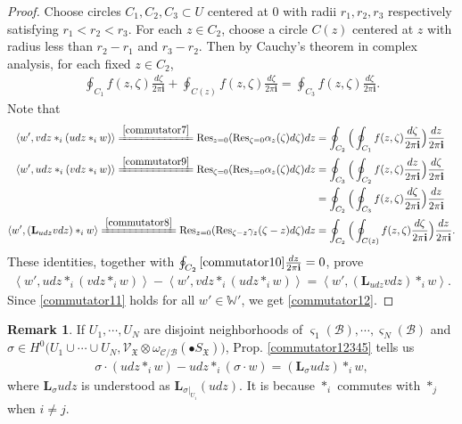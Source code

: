 \documentclass[11pt,b5paper,notitlepage]{article}
\theoremstyle{definition}
\newtheorem{rem}[df]{Remark}
\theoremstyle{plain}
\newcommand{\Lbf}{\mathbf{L}}
\newcommand{\Res}{\mathrm{Res}}
\newcommand{\SV}{\mathscr{V}}
\newcommand{\im}{\mathbf{i}}
\newcommand{\sgm}{\varsigma}
\newcommand{\blt}{\bullet}
\newcommand{\Wbb}{\mathbb W}
\newcommand{\<}{\left\langle}
\renewcommand{\>}{\right\rangle}
\newcommand{\MC}{\mathcal{C}}
\newcommand{\MB}{\mathcal{B}}
\newcommand{\fx}{\mathfrak{X}}
\numberwithin{equation}{section}
\begin{document}
\begin{proof}
    Choose circles $C_1,C_2,C_3\subset U$ centered at $0$ with radii $r_1,r_2,r_3$ respectively satisfying $r_1<r_2<r_3$. For each $z\in C_2$, choose a circle $C(z)$ centered at $z$ with radius less than $r_2-r_1$ and $r_3-r_2$. Then by Cauchy's theorem in complex analysis, for each fixed $z\in C_2$,
    \begin{align}\label{commutator10}
        \oint_{C_1}f(z,\zeta)\frac{d\zeta}{2\pi \im}+\oint_{C(z)}f(z,\zeta)\frac{d\zeta}{2\pi \im}=\oint_{C_3}f(z,\zeta)\frac{d\zeta}{2\pi \im}.
    \end{align}
    Note that 
    \begin{align*}
        \<w',vdz*_i (udz*_i w)\>\xlongequal{\eqref{commutator7}} \Res_{z=0}(\Res_{\zeta=0}\alpha_z(\zeta)d\zeta)dz&=\oint_{C_2}\Big(\oint_{C_1}f(z,\zeta)\frac{d\zeta}{2\pi \im}\Big)\frac{dz}{2\pi \im}\\
        \<w',udz*_i (vdz*_i w)\>\xlongequal{\eqref{commutator9}} \Res_{\zeta=0}(\Res_{z=0}\alpha_z(\zeta)d\zeta)dz&=\oint_{C_3}\Big(\oint_{C_2}f(z,\zeta)\frac{dz}{2\pi \im}\Big)\frac{d\zeta}{2\pi \im}\\
        &=\oint_{C_2}\Big(\oint_{C_3}f(z,\zeta)\frac{d\zeta}{2\pi \im}\Big)\frac{dz}{2\pi \im}\\
        \<w',(\Lbf_{udz}vdz)*_i w\>\xlongequal{\eqref{commutator8}} \Res_{z=0}(\Res_{\zeta-z}\gamma_z(\zeta-z)d\zeta)dz&=\oint_{C_2}\Big(\oint_{C(z)}f(z,\zeta)\frac{d\zeta}{2\pi \im}\Big)\frac{dz}{2\pi \im}.
    \end{align*}
    These identities, together with $\oint_{C_2}\eqref{commutator10}\frac{dz}{2\pi \im}=0$, prove
    \begin{align}\label{commutator11}
        \<w',udz*_i (vdz*_i w)\>-\<w',vdz*_i(udz*_i w)\>=\<w',(\Lbf_{udz}vdz)*_i w\>.
    \end{align}
    Since \eqref{commutator11} holds for all $w'\in \Wbb'$, we get \eqref{commutator12}.
\end{proof}
\begin{rem}
    If $U_1,\cdots,U_N$ are disjoint neighborhoods of $\sgm_1(\MB),\cdots,\sgm_N(\MB)$ and $\sigma\in H^0\big(U_1\cup \cdots \cup U_N,\SV_\fx\otimes \omega_{\MC/\MB}(\blt S_\fx)\big)$, Prop. \ref{commutator12345} tells us 
    \begin{align}\label{commutator666}
        \sigma\cdot (udz*_i w)-udz*_i(\sigma\cdot w)=(\Lbf_{\sigma}udz)*_i w,
    \end{align}
    where $\Lbf_{\sigma}udz$ is understood as $\Lbf_{\sigma\vert_{U_i}}(udz)$. It is because $*_i$ commutes with $*_j$ when $i\ne j$.
\end{rem}
\end{document}
